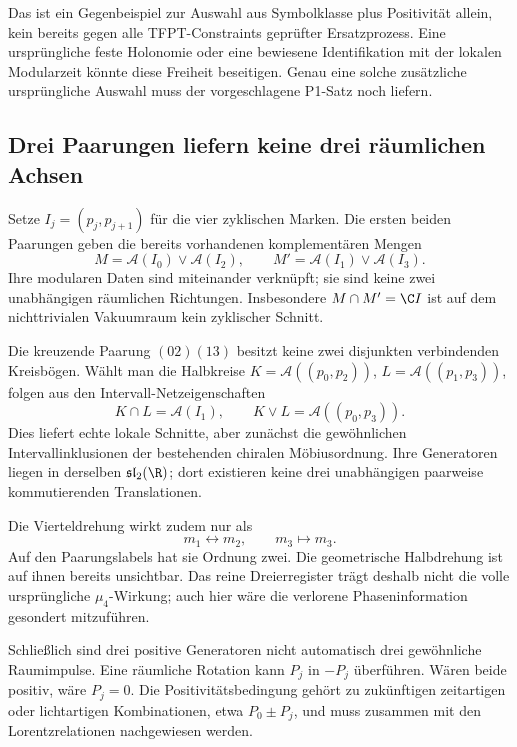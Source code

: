 Das ist ein Gegenbeispiel zur Auswahl aus Symbolklasse plus Positivität allein, kein bereits gegen alle TFPT-Constraints geprüfter Ersatzprozess. Eine ursprüngliche feste Holonomie oder eine bewiesene Identifikation mit der lokalen Modularzeit könnte diese Freiheit beseitigen. Genau eine solche zusätzliche ursprüngliche Auswahl muss der vorgeschlagene P1-Satz noch liefern.

\subsection{Drei Paarungen liefern keine drei räumlichen Achsen}
Setze $I_j=(p_j,p_{j+1})$ für die vier zyklischen Marken. Die ersten beiden Paarungen geben die bereits vorhandenen komplementären Mengen
\begin{equation}
M=\mathcal A(I_0)\vee\mathcal A(I_2),\qquad
M'=\mathcal A(I_1)\vee\mathcal A(I_3).
\end{equation}
Ihre modularen Daten sind miteinander verknüpft; sie sind keine zwei unabhängigen räumlichen Richtungen. Insbesondere $M\cap M'=\C I$ ist auf dem nichttrivialen Vakuumraum kein zyklischer Schnitt.

Die kreuzende Paarung $(02)(13)$ besitzt keine zwei disjunkten verbindenden Kreisbögen. Wählt man die Halbkreise
$K=\mathcal A((p_0,p_2))$, $L=\mathcal A((p_1,p_3))$,
folgen aus den Intervall-Netzeigenschaften
\begin{equation}
K\cap L=\mathcal A(I_1),\qquad
K\vee L=\mathcal A((p_0,p_3)).
\end{equation}
Dies liefert echte lokale Schnitte, aber zunächst die gewöhnlichen Intervallinklusionen der bestehenden chiralen Möbiusordnung. Ihre Generatoren liegen in derselben $\mathfrak{sl}_2(\R)$; dort existieren keine drei unabhängigen paarweise kommutierenden Translationen.

Die Vierteldrehung wirkt zudem nur als
\begin{equation}
m_1\longleftrightarrow m_2,\qquad m_3\longmapsto m_3.
\end{equation}
Auf den Paarungslabels hat sie Ordnung zwei. Die geometrische Halbdrehung ist auf ihnen bereits unsichtbar. Das reine Dreierregister trägt deshalb nicht die volle ursprüngliche $\mu_4$-Wirkung; auch hier wäre die verlorene Phaseninformation gesondert mitzuführen.

Schließlich sind drei positive Generatoren nicht automatisch drei gewöhnliche Raumimpulse. Eine räumliche Rotation kann $P_j$ in $-P_j$ überführen. Wären beide positiv, wäre $P_j=0$. Die Positivitätsbedingung gehört zu zukünftigen zeitartigen oder lichtartigen Kombinationen, etwa $P_0\pm P_j$, und muss zusammen mit den Lorentzrelationen nachgewiesen werden.

